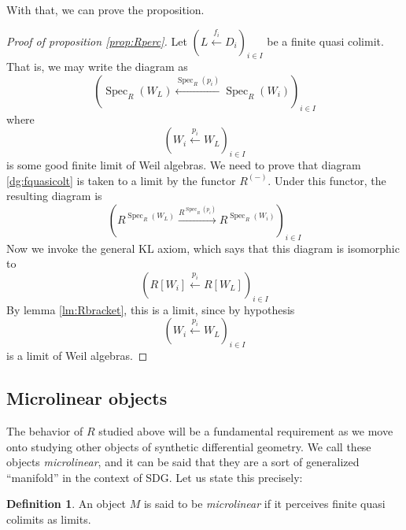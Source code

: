 \documentclass[11pt]{article}
\theoremstyle{definition}
\newtheorem{defn}{Definition}[section]
\newcommand{\farg}{-} %
\DeclareMathOperator{\spec}{Spec}
\numberwithin{equation}{section}
\begin{document}
With that, we can prove the proposition.

\begin{proof}[Proof of proposition \ref{prop:Rperc}]
  Let \( \left(L\stackrel{f_i}{\longleftarrow}D_i\right)_{i\in I} \) be a finite quasi colimit. That is, we may write the diagram as
  \begin{equation}
    \left(\spec_R(W_L)\stackrel{\spec_R(p_i)}{\longleftarrow}\spec_R(W_i)\right)_{i\in I}
    \label{dg:fquasicolt}
  \end{equation}
  where
  \begin{equation*}
   \left(W_i\stackrel{p_i}{\longleftarrow}W_L\right)_{i\in I}
  \end{equation*}
  is some good finite limit of Weil algebras. We need to prove that diagram \ref{dg:fquasicolt} is taken to a limit by the functor \( R^{(\farg)} \). Under this functor, the resulting diagram is
  \begin{equation}
    \left(R^{\spec_R(W_L)}\stackrel{R^{\spec_R(p_i)}}{\longrightarrow}R^{\spec_R(W_i)}\right)_{i\in I}
    \label{dg:Rfqc}
  \end{equation}
  Now we invoke the general KL axiom, which says that this diagram is isomorphic to
  \begin{equation*}
    \left(R[W_i]\stackrel{p_i}{\longleftarrow}R[W_L]\right)_{i\in I}
  \end{equation*}
  By lemma \ref{lm:Rbracket}, this is a limit, since by hypothesis
  \begin{equation*}
   \left(W_i\stackrel{p_i}{\longleftarrow}W_L\right)_{i\in I}
  \end{equation*} 
  is a limit of Weil algebras.
\end{proof}

\subsection{Microlinear objects}

The behavior of \( R \) studied above will be a fundamental requirement as we move onto studying other objects of synthetic differential geometry. We call these objects \emph{microlinear}, and it can be said that they are a sort of generalized ``manifold'' in the context of SDG. Let us state this precisely:

\begin{defn}
  An object \( M \) is said to be \emph{microlinear} if it perceives finite quasi colimits as limits.
\end{defn}
\end{document}
